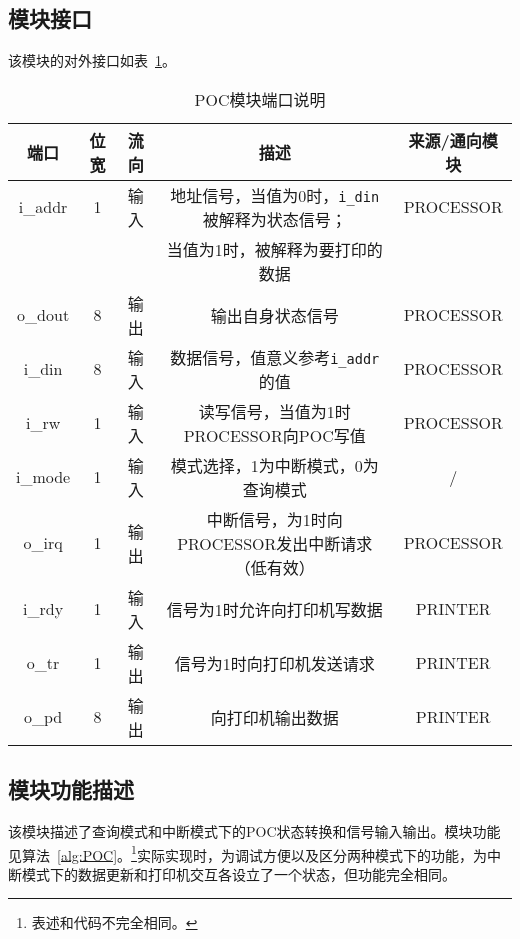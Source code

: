 \documentclass[lang=cn,a4paper,newtx]{elegantpaper}
\begin{document}
\subsection{模块接口}
该模块的对外接口如表~\ref{tab:port_description_poc}。
\begin{table}[htbp]
    \centering
    \renewcommand{\arraystretch}{1.2} %
    \begin{tabular}{c c c c c}
        \toprule
        端口 & 位宽 & 流向 & 描述 & 来源/通向模块 \\
        \midrule
        i\_addr  &1 & 输入 & 地址信号，当值为0时，\texttt{i\_din}被解释为状态信号；& PROCESSOR \\
                & & & 当值为1时，被解释为要打印的数据 & \\
        o\_dout  & 8 & 输出 & 输出自身状态信号 & PROCESSOR \\
        i\_din   & 8 & 输入 & 数据信号，值意义参考\texttt{i\_addr}的值 & PROCESSOR\\
        i\_rw    & 1 & 输入 & 读写信号，当值为1时PROCESSOR向POC写值 & PROCESSOR \\
        i\_mode  & 1 & 输入 & 模式选择，1为中断模式，0为查询模式 & / \\
        o\_irq   & 1 & 输出 & 中断信号，为1时向PROCESSOR发出中断请求（低有效） & PROCESSOR \\
        i\_rdy   & 1 & 输入 & 信号为1时允许向打印机写数据 & PRINTER\\
        o\_tr    & 1 & 输出 & 信号为1时向打印机发送请求 & PRINTER\\
        o\_pd    & 8 & 输出 & 向打印机输出数据 & PRINTER \\
        \bottomrule
    \end{tabular}
    \caption{POC模块端口说明}
    \label{tab:port_description_poc}
\end{table}
\subsection{模块功能描述}
该模块描述了查询模式和中断模式下的POC状态转换和信号输入输出。模块功能见算法~\ref{alg:POC}。\footnote{表述和代码不完全相同。}实际实现时，为调试方便以及区分两种模式下的功能，为中断模式下的数据更新和打印机交互各设立了一个状态，但功能完全相同。
\end{document}

